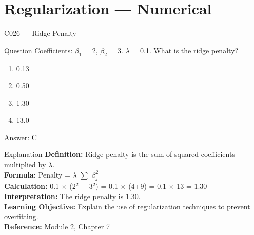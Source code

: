 \documentclass[aspectratio=169,8pt]{beamer}
\begin{document}
	\section{Regularization --- Numerical}
	
	\begin{frame}{C026 --- Ridge Penalty}
		\begin{block}{Question}
			Coefficients: $\beta_1$ = 2, $\beta_2$ = 3. $\lambda$ = 0.1. What is the ridge penalty?
			\begin{enumerate}
				\item 0.13
				\item 0.50
				\item 1.30
				\item 13.0
			\end{enumerate}
		\end{block}
		\begin{exampleblock}{Answer: C}\end{exampleblock}
		\begin{block}{Explanation}
			\textbf{Definition:} Ridge penalty is the sum of squared coefficients multiplied by $\lambda$.\\
			\textbf{Formula:} Penalty = $\lambda$ $\sum$ $\beta_j^2$\\
			\textbf{Calculation:} 0.1 $\times$ (2$^2$ + 3$^2$) = 0.1 $\times$ (4+9) = 0.1 $\times$ 13 = 1.30\\
			\textbf{Interpretation:} The ridge penalty is 1.30.\\
			\textbf{Learning Objective:} Explain the use of regularization techniques to prevent overfitting.\\
			\textbf{Reference:} Module 2, Chapter 7
		\end{block}
	\end{frame}
	
\end{document}
